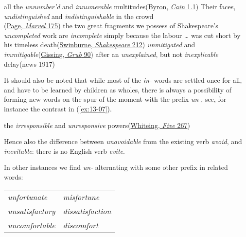 \ea \label{ex:13-02}
\ea
all the \emph{unnumber'd} and \emph{innumerable} multitudes\hfill(\href{https://archive.org/details/cainmystery01byro/page/24/mode/2up?q=%22innumerable+multitudes%22&view=theater}{Byron, \textit{Cain} 1.1})
\ex
Their faces, \emph{undistinguished} and \emph{indistinguishable} in the crowd\\\hfill(\href{https://archive.org/details/johnmarvelassist00page_0/page/174/mode/2up?view=theater&q=undistinguished}{Page, \textit{Marvel} 175})
\ex
the two great fragments we possess of Shakespeare’s \emph{uncompleted} work are \emph{incomplete} simply because the labour {\dots} was cut short by his timeless death\hfill(\href{https://archive.org/details/studyofshakespea0000swin/page/212/mode/2up?q=%22fragments+we+possess%22&view=theater}{Swinburne, \textit{Shakespeare} 212}) %
\ex
\emph{unmitigated} and \emph{immitigable}\hfill(\href{https://archive.org/details/newgrubstreetnov01gissuoft/page/184/mode/2up?q=%22unmitigated%22&view=theater}{Gissing, \textit{Grub} 90})
\ex
after an \emph{unexplained}, but not \emph{inexplicable} delay\hfill(news 1917)
\z
\z
{}

It should also be noted that while most of the \textit{in-} words are settled once for all, and have to be learned by children as wholes, there is always a possibility of forming new words on the spur of the moment with the prefix \textit{un-}, see, for instance the contrast in (\ref{ex:13-07}).

\ea \label{ex:13-07}the \emph{irresponsible} and \emph{unresponsive} powers\hfill(\href{https://archive.org/details/nojohnstreet00whitgoog/page/n307/mode/2up?q=%22irresponsible+and+unresponsive%22&view=theater}{Whiteing, \textit{Five} 267})
\z

Hence also the difference between \textit{unavoidable} from the existing verb \textit{avoid}, and \textit{inevitable}: there is no English verb \textit{evite}. %

In other instances we find \textit{un-} alternating with some other prefix in related words:

\bigskip

\begin{tabular}{ll}
 \textit{unfortunate}& \textit{misfortune}\\
 \textit{unsatisfactory}& \textit{dissatisfaction}\\
 \textit{uncomfortable}& \textit{discomfort}\\
\end{tabular}

